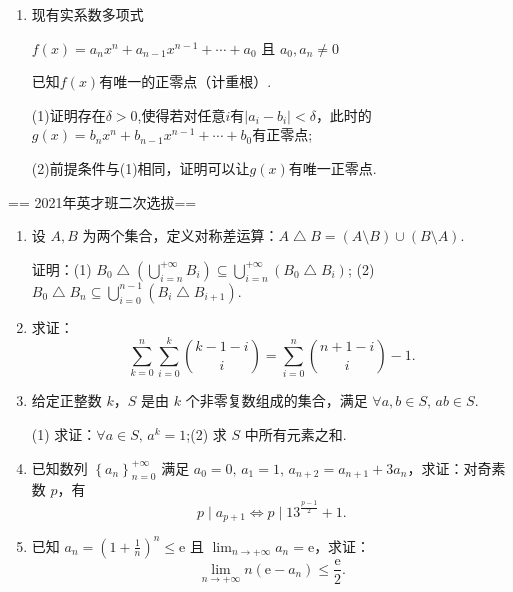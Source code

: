 \begin{enumerate}
	(2)现有向量$a^1,a^2,\cdots,a^m$（$m$和$n$已知）.
	
	求最大的$k$，使得$S(a^1)\bigcap S(a^2)\bigcap \cdots \bigcap S(a^m)$ 至少有$k$个元素.

\item 现有实系数多项式
	\begin{center}
	$f(x)=a_n x^n+a_{n-1} x^{n-1}+\cdots +a_0 $ 且 $a_0,a_n\ne 0$
	\end{center}
	
	已知$f(x)$有唯一的正零点（计重根）.
	
	(1)证明存在$\delta>0$,使得若对任意$i$有$|a_i-b_i|<\delta $，此时的$g(x)=b_n x^n+b_{n-1} x^{n-1}+\cdots +b_0$有正零点;
	
	(2)前提条件与(1)相同，证明可以让$g(x)$有唯一正零点.


\end{enumerate}

== 2021年英才班二次选拔==
\begin{enumerate}
\item 设 $A,B$ 为两个集合，定义对称差运算：$A \bigtriangleup B=(A\setminus B)\cup(B\setminus A)$.

证明：(1) $\displaystyle B_0\bigtriangleup\left(\bigcup_{i=n}^{+\infty}B_i\right)\subseteq\bigcup_{i=n}^{+\infty}(B_0 \bigtriangleup B_i)$;\quad
(2) $\displaystyle B_0\bigtriangleup B_n\subseteq \bigcup_{i=0}^{n-1}(B_{i} \bigtriangleup B_{i+1})$.

\item 求证：
\[
\sum_{k=0}^n\sum_{i=0}^{k}\binom{k-1-i}{i}=\sum_{i=0}^n\binom{n+1-i}{i}-1.
\]

\item 给定正整数 $k$，$S$ 是由 $k$ 个非零复数组成的集合，满足 $\forall a,b\in S,\,ab\in S$.

(1) 求证：$\displaystyle\forall a\in S,\,a^k=1$;\quad (2) 求 $S$ 中所有元素之和.

\item 已知数列 $\left\{ a_n \right\}_{n=0}^{+\infty}$ 满足 $a_0=0,\,a_1=1,\,a_{n+2}=a_{n+1}+3a_n$，求证：对奇素数 $p$，有 
\[
p \mid a_{p+1} \Leftrightarrow p \mid 13^{\frac{p-1}{2}}+1.
\]

\item 已知 $\displaystyle a_n=\left( 1+\frac{1}{n} \right)^n\leq \mathrm{e}$ 且 $\displaystyle \lim_{n\to+\infty}a_n=\mathrm{e}$，求证：
\[
\lim_{n\to+\infty}n(\mathrm{e}-a_n)\leq\frac{\mathrm{e}}{2}.
\]
\end{enumerate}